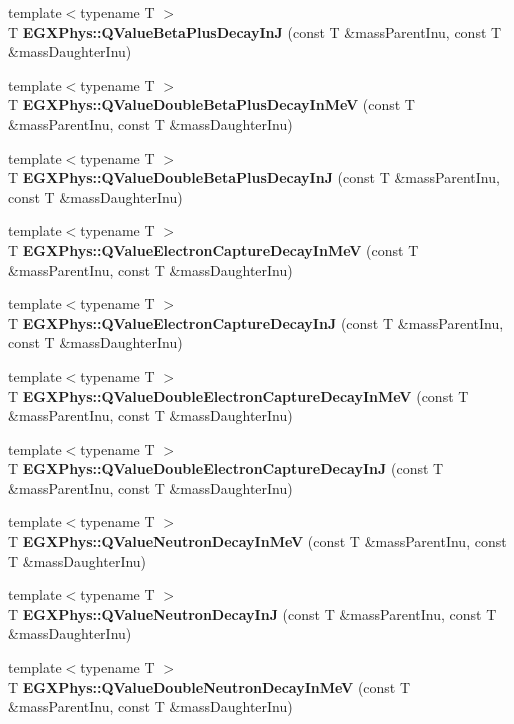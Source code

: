 \begin{DoxyCompactItemize}
\item 
{\footnotesize template$<$typename T $>$ }\\T {\bfseries E\+G\+X\+Phys\+::\+Q\+Value\+Beta\+Plus\+Decay\+InJ} (const T \&mass\+Parent\+Inu, const T \&mass\+Daughter\+Inu)
\item 
{\footnotesize template$<$typename T $>$ }\\T {\bfseries E\+G\+X\+Phys\+::\+Q\+Value\+Double\+Beta\+Plus\+Decay\+In\+MeV} (const T \&mass\+Parent\+Inu, const T \&mass\+Daughter\+Inu)
\item 
{\footnotesize template$<$typename T $>$ }\\T {\bfseries E\+G\+X\+Phys\+::\+Q\+Value\+Double\+Beta\+Plus\+Decay\+InJ} (const T \&mass\+Parent\+Inu, const T \&mass\+Daughter\+Inu)
\item 
{\footnotesize template$<$typename T $>$ }\\T {\bfseries E\+G\+X\+Phys\+::\+Q\+Value\+Electron\+Capture\+Decay\+In\+MeV} (const T \&mass\+Parent\+Inu, const T \&mass\+Daughter\+Inu)
\item 
{\footnotesize template$<$typename T $>$ }\\T {\bfseries E\+G\+X\+Phys\+::\+Q\+Value\+Electron\+Capture\+Decay\+InJ} (const T \&mass\+Parent\+Inu, const T \&mass\+Daughter\+Inu)
\item 
{\footnotesize template$<$typename T $>$ }\\T {\bfseries E\+G\+X\+Phys\+::\+Q\+Value\+Double\+Electron\+Capture\+Decay\+In\+MeV} (const T \&mass\+Parent\+Inu, const T \&mass\+Daughter\+Inu)
\item 
{\footnotesize template$<$typename T $>$ }\\T {\bfseries E\+G\+X\+Phys\+::\+Q\+Value\+Double\+Electron\+Capture\+Decay\+InJ} (const T \&mass\+Parent\+Inu, const T \&mass\+Daughter\+Inu)
\item 
{\footnotesize template$<$typename T $>$ }\\T {\bfseries E\+G\+X\+Phys\+::\+Q\+Value\+Neutron\+Decay\+In\+MeV} (const T \&mass\+Parent\+Inu, const T \&mass\+Daughter\+Inu)
\item 
{\footnotesize template$<$typename T $>$ }\\T {\bfseries E\+G\+X\+Phys\+::\+Q\+Value\+Neutron\+Decay\+InJ} (const T \&mass\+Parent\+Inu, const T \&mass\+Daughter\+Inu)
\item 
{\footnotesize template$<$typename T $>$ }\\T {\bfseries E\+G\+X\+Phys\+::\+Q\+Value\+Double\+Neutron\+Decay\+In\+MeV} (const T \&mass\+Parent\+Inu, const T \&mass\+Daughter\+Inu)

\end{DoxyCompactItemize}
